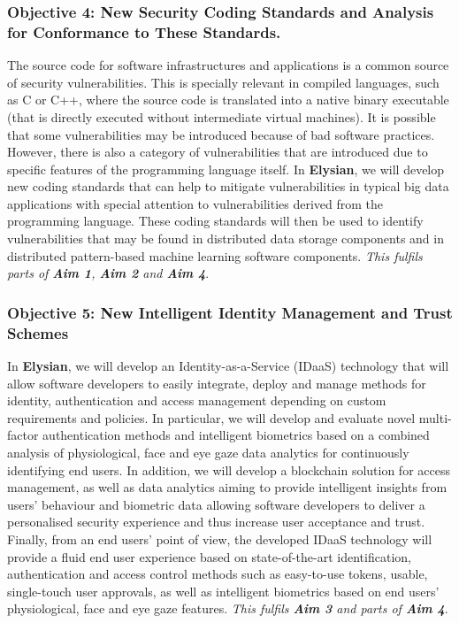 \documentclass[a4paper,11pt]{article}
\newcommand{\project}[1]{\textbf{#1}\xspace}
\newcommand{\SECURITY}{\project{Elysian}}
\newcommand{\TheProject}{\SECURITY}
\begin{document}
\subsubsection*{Objective 4: New Security Coding Standards and Analysis for Conformance to These Standards.}
The source code for software infrastructures and applications is a common source of security vulnerabilities. This is specially relevant in compiled languages, such as C or C++, where the source code is translated into a native binary executable (that is directly executed without intermediate virtual machines). It is possible that some vulnerabilities may be introduced because of bad software practices. However, there is also a category of vulnerabilities that are introduced due to specific features of the programming language itself.
In \TheProject{}, we will develop new coding standards that can help to mitigate vulnerabilities in typical big data applications with special attention to vulnerabilities derived from  the programming language. %
These coding standards will then be used to identify vulnerabilities that may be found in distributed data storage components and in distributed pattern-based machine learning software components. \emph{This fulfils parts of \textbf{Aim 1}, \textbf{Aim 2} and \textbf{Aim 4}}.

\subsubsection*{Objective 5: New Intelligent Identity Management and Trust Schemes}
\vspace{-6pt}

In \TheProject{}, we will develop an Identity-as-a-Service (IDaaS) technology that will allow software developers to easily integrate, deploy and manage methods for identity, authentication and access management depending on custom requirements and policies. In particular, we will develop and evaluate novel multi-factor authentication methods and intelligent biometrics based on a combined analysis of physiological, face and eye gaze data analytics for continuously identifying end users. In addition, we will develop a blockchain solution for access management, as well as data analytics aiming to provide intelligent insights from users' behaviour and biometric data allowing software developers to deliver a personalised security experience and thus increase user acceptance and trust. Finally, from an end users' point of view, the developed IDaaS technology will provide a fluid end user experience based on state-of-the-art identification, authentication and access control methods such as easy-to-use tokens, usable, single-touch user approvals, as well as intelligent biometrics based on end users' physiological, face and eye gaze features. \emph{This fulfils \textbf{Aim 3} and parts of \textbf{Aim 4}}.
\end{document}
